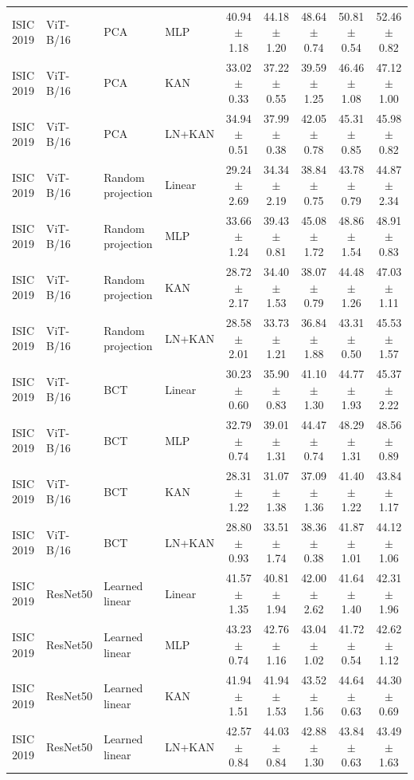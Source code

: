\documentclass[10pt]{article}
\begin{document}
\begin{longtable}{llllccccc}
ISIC 2019 & ViT-B/16 & PCA & MLP & 40.94 $\pm$ 1.18 & 44.18 $\pm$ 1.20 & 48.64 $\pm$ 0.74 & 50.81 $\pm$ 0.54 & 52.46 $\pm$ 0.82 \\
ISIC 2019 & ViT-B/16 & PCA & KAN & 33.02 $\pm$ 0.33 & 37.22 $\pm$ 0.55 & 39.59 $\pm$ 1.25 & 46.46 $\pm$ 1.08 & 47.12 $\pm$ 1.00 \\
ISIC 2019 & ViT-B/16 & PCA & LN+KAN & 34.94 $\pm$ 0.51 & 37.99 $\pm$ 0.38 & 42.05 $\pm$ 0.78 & 45.31 $\pm$ 0.85 & 45.98 $\pm$ 0.82 \\
ISIC 2019 & ViT-B/16 & Random projection & Linear & 29.24 $\pm$ 2.69 & 34.34 $\pm$ 2.19 & 38.84 $\pm$ 0.75 & 43.78 $\pm$ 0.79 & 44.87 $\pm$ 2.34 \\
ISIC 2019 & ViT-B/16 & Random projection & MLP & 33.66 $\pm$ 1.24 & 39.43 $\pm$ 0.81 & 45.08 $\pm$ 1.72 & 48.86 $\pm$ 1.54 & 48.91 $\pm$ 0.83 \\
ISIC 2019 & ViT-B/16 & Random projection & KAN & 28.72 $\pm$ 2.17 & 34.40 $\pm$ 1.53 & 38.07 $\pm$ 0.79 & 44.48 $\pm$ 1.26 & 47.03 $\pm$ 1.11 \\
ISIC 2019 & ViT-B/16 & Random projection & LN+KAN & 28.58 $\pm$ 2.01 & 33.73 $\pm$ 1.21 & 36.84 $\pm$ 1.88 & 43.31 $\pm$ 0.50 & 45.53 $\pm$ 1.57 \\
ISIC 2019 & ViT-B/16 & BCT & Linear & 30.23 $\pm$ 0.60 & 35.90 $\pm$ 0.83 & 41.10 $\pm$ 1.30 & 44.77 $\pm$ 1.93 & 45.37 $\pm$ 2.22 \\
ISIC 2019 & ViT-B/16 & BCT & MLP & 32.79 $\pm$ 0.74 & 39.01 $\pm$ 1.31 & 44.47 $\pm$ 0.74 & 48.29 $\pm$ 1.31 & 48.56 $\pm$ 0.89 \\
ISIC 2019 & ViT-B/16 & BCT & KAN & 28.31 $\pm$ 1.22 & 31.07 $\pm$ 1.38 & 37.09 $\pm$ 1.36 & 41.40 $\pm$ 1.22 & 43.84 $\pm$ 1.17 \\
ISIC 2019 & ViT-B/16 & BCT & LN+KAN & 28.80 $\pm$ 0.93 & 33.51 $\pm$ 1.74 & 38.36 $\pm$ 0.38 & 41.87 $\pm$ 1.01 & 44.12 $\pm$ 1.06 \\
\midrule
ISIC 2019 & ResNet50 & Learned linear & Linear & 41.57 $\pm$ 1.35 & 40.81 $\pm$ 1.94 & 42.00 $\pm$ 2.62 & 41.64 $\pm$ 1.40 & 42.31 $\pm$ 1.96 \\
ISIC 2019 & ResNet50 & Learned linear & MLP & 43.23 $\pm$ 0.74 & 42.76 $\pm$ 1.16 & 43.04 $\pm$ 1.02 & 41.72 $\pm$ 0.54 & 42.62 $\pm$ 1.12 \\
ISIC 2019 & ResNet50 & Learned linear & KAN & 41.94 $\pm$ 1.51 & 41.94 $\pm$ 1.53 & 43.52 $\pm$ 1.56 & 44.64 $\pm$ 0.63 & 44.30 $\pm$ 0.69 \\
ISIC 2019 & ResNet50 & Learned linear & LN+KAN & 42.57 $\pm$ 0.84 & 44.03 $\pm$ 0.84 & 42.88 $\pm$ 1.30 & 43.84 $\pm$ 0.63 & 43.49 $\pm$ 1.63 \\

\end{longtable}
\end{document}
